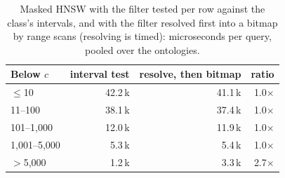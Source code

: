 \begin{table}[t]
\caption{Masked HNSW with the filter tested per row against the class's intervals, and with the filter resolved first into a bitmap by range scans (resolving is timed): microseconds per query, pooled over the ontologies.}
\label{tab-resolve}
\small
\begin{tabular}{@{}lrrr@{}}
\toprule
Below $c$ & interval test & resolve, then bitmap & ratio \\
\midrule
$\le$10 & 42.2\,k & 41.1\,k & 1.0$\times$ \\
11--100 & 38.1\,k & 37.4\,k & 1.0$\times$ \\
101--1,000 & 12.0\,k & 11.9\,k & 1.0$\times$ \\
1,001--5,000 & 5.3\,k & 5.4\,k & 1.0$\times$ \\
$>$5,000 & 1.2\,k & 3.3\,k & 2.7$\times$ \\
\bottomrule
\end{tabular}
\end{table}
